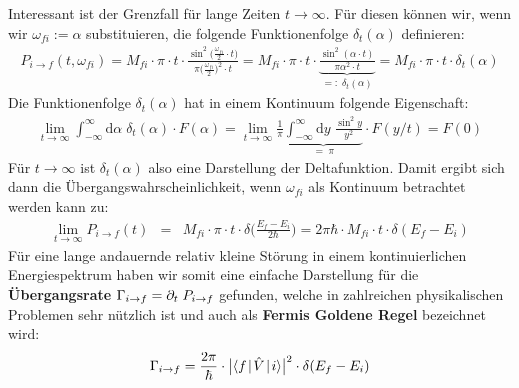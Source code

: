 Interessant ist der Grenzfall für lange Zeiten $t\to\infty$. Für diesen können wir, wenn wir $\omega_{fi}:=\alpha$ substituieren, die folgende Funktionenfolge $\delta_t(\alpha)$ definieren: 
\begin{eqnarray*}
	P_{i\to f}(t,\omega_{fi}) = M_{fi}\cdot\pi\cdot t\cdot \frac{\sin^2\big(\frac{\omega_{fi}}{2}\cdot t\big)}{\pi \big(\frac{\omega_{fi}}{2}\big)^2\cdot t} = M_{fi}\cdot\pi\cdot t\cdot\underbrace{\frac{\sin^2(\alpha\cdot t)}{\pi\alpha^2\cdot t}}_{=:\;\delta_t(\alpha)} = M_{fi}\cdot\pi\cdot t\cdot \delta_t(\alpha)
\end{eqnarray*}
Die Funktionenfolge $\delta_t(\alpha)$ hat in einem Kontinuum folgende Eigenschaft: 
\begin{eqnarray*}
	\lim_{t\to\infty}\int_{-\infty}^{\infty}\mathrm{d}\alpha\;\delta_t(\alpha)\cdot F(\alpha) = \lim_{t\to\infty}\frac{1}{\pi}\underbrace{\int_{-\infty}^{\infty}\mathrm{d}y\;\frac{\sin^2y}{y^2}}_{=\;\pi}\cdot F(y/t) = F(0)
\end{eqnarray*}
Für $t\to\infty$ ist $\delta_t(\alpha)$ also eine Darstellung der Deltafunktion. Damit ergibt sich dann die Übergangswahrscheinlichkeit, wenn $\omega_{fi}$ als Kontinuum betrachtet werden kann zu: 
\begin{eqnarray*}
	\lim_{t\to\infty}P_{i\to f}(t) &=& M_{fi}\cdot\pi\cdot t\cdot \delta\Big(\frac{E_f-E_i}{2\hbar}\Big) = 2\pi\hbar\cdot M_{fi}\cdot t\cdot \delta(E_f-E_i)
\end{eqnarray*}
Für eine lange andauernde relativ kleine Störung in einem kontinuierlichen Energiespektrum haben wir somit eine einfache Darstellung für die {\bf Übergangsrate} $\Gamma_{i\to f}=\partial_t\;P_{i\to f}$ gefunden, welche in zahlreichen physikalischen Problemen sehr nützlich ist und auch als {\bf Fermis Goldene Regel} bezeichnet wird: 
\begin{eqnarray}
	\Gamma_{i\to f} =  \frac{2\pi}{\hbar}\cdot\big|\bracket{f}{\hat{V}}{i}\big|^2 \cdot \delta(E_f-E_i) \label{FermisGoldeneRegel}
\end{eqnarray}
